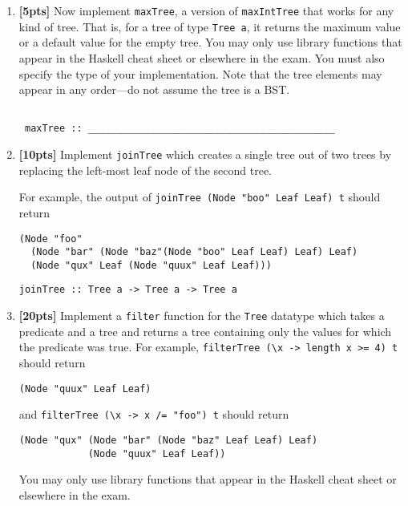 \documentclass[paper=letter, fontsize=13pt]{article} %
\numberwithin{equation}{section} %
\newif\ifshowanswers\showanswersfalse
\begin{document}
\begin{enumerate}
\item \textbf{[5pts]} 
  Now implement \texttt{maxTree}, a version of \texttt{maxIntTree} that works for any kind of tree. That is, for a tree of type \texttt{Tree a}, it returns 
   the maximum value or a default value for the empty tree.
  You may only use library functions that appear in the Haskell cheat sheet or elsewhere in the exam. You must also specify the type of your implementation.  
  Note that the tree elements may appear in any order—do not assume the tree is a BST.

\ifshowanswers 
\begin{lstlisting}
 maxTree :: Ord a => a -> Tree a -> a
 maxTree d = foldTree max d
\end{lstlisting}
\else
\begin{verbatim}

 maxTree :: ___________________________________________
\end{verbatim}
\bigskip 
\bigskip 
\bigskip 
\bigskip 
\bigskip 
\bigskip 
\bigskip 
\bigskip 
\bigskip 
\bigskip 
\bigskip 
\bigskip 
\fi

\item \textbf{[10pts]} Implement \texttt{joinTree} which creates a single tree out of two trees
by replacing the left-most leaf node of the second tree.  

For example, the output of \texttt{joinTree (Node "boo" Leaf Leaf) t} should return
\begin{verbatim}
(Node "foo"  
  (Node "bar" (Node "baz"(Node "boo" Leaf Leaf) Leaf) Leaf) 
  (Node "qux" Leaf (Node "quux" Leaf Leaf)))
\end{verbatim}

\begin{verbatim}
joinTree :: Tree a -> Tree a -> Tree a
\end{verbatim}
      
\ifshowanswers 
\begin{lstlisting}
 joinTree t Leaf = t 
 joinTree t (Node v l r) = Node v (joinTree t l) r 
\end{lstlisting}
\else
     \bigskip
     \bigskip
     \bigskip
     \bigskip
     \bigskip
     \bigskip
     \bigskip
     \bigskip
     \bigskip
     \bigskip
\fi

\newpage
\item \textbf{[20pts]} Implement a \texttt{filter} function for the \texttt{Tree} datatype
which takes a predicate and a tree and returns a tree containing only the values for which 
the predicate was true. For example, \verb|filterTree (\x -> length x >= 4) t| should return
\begin{verbatim}
(Node "quux" Leaf Leaf)
\end{verbatim}
and \verb|filterTree (\x -> x /= "foo") t| should return
\begin{verbatim}
(Node "qux" (Node "bar" (Node "baz" Leaf Leaf) Leaf) 
            (Node "quux" Leaf Leaf))
\end{verbatim}
You may only use library functions that appear in the Haskell cheat sheet or elsewhere in the exam.


\end{enumerate}
\end{document}
